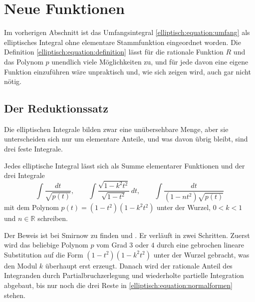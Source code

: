 %
%
%
%
\section{Neue Funktionen
\label{elliptisch:section:funktionen}}

Im vorherigen Abschnitt ist das Umfangsintegral
\eqref{elliptisch:equation:umfang} als elliptisches Integral ohne
elementare Stammfunktion eingeordnet worden.
Die Definition \eqref{elliptisch:equation:definition} lässt für die
rationale Funktion $R$ und das Polynom $p$ unendlich viele
Möglichkeiten zu, und für jede davon eine eigene Funktion
einzuführen wäre unpraktisch und, wie sich zeigen wird, auch gar
nicht nötig.

\subsection{Der Reduktionssatz}
Die elliptischen Integrale bilden zwar eine unübersehbare Menge,
aber sie unterscheiden sich nur um elementare Anteile, und was
davon übrig bleibt, sind drei feste Integrale.
\begin{satz}[Reduktionssatz]
\label{elliptisch:satz:reduktion}
Jedes elliptische Integral lässt sich als Summe elementarer
Funktionen und der drei Integrale
\begin{equation}
\int \frac{dt}{\sqrt{p(t)}},
\qquad
\int \frac{\sqrt{1-k^2t^2}}{\sqrt{1-t^2}}\,dt,
\qquad
\int \frac{dt}{(1-nt^2)\sqrt{p(t)}}
\label{elliptisch:equation:normalformen}
\end{equation}
mit dem Polynom $p(t) = (1-t^2)(1-k^2t^2)$ unter der Wurzel,
$0 < k < 1$ und $n \in \mathbb{R}$ schreiben.
\end{satz}
Der Beweis ist bei Smirnow zu finden
\cite[Abschnitt~164, S.~506]{elliptisch:smirnow} und \cite{elliptisch:mueller-spezielle}.
Er verläuft in zwei Schritten.
Zuerst wird das beliebige Polynom $p$ vom Grad $3$ oder $4$ durch
eine gebrochen lineare Substitution auf die Form
$(1-t^2)(1-k^2t^2)$ unter der Wurzel gebracht, was den Modul $k$
überhaupt erst erzeugt.
Danach wird der rationale Anteil des Integranden durch
Partialbruchzerlegung und wiederholte partielle Integration
abgebaut, bis nur noch die drei Reste in
\eqref{elliptisch:equation:normalformen} stehen.
%


